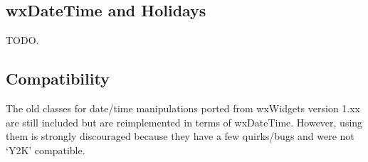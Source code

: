 \subsection{wxDateTime and Holidays}\label{tdateholidays}

TODO.

\subsection{Compatibility}\label{tdatecompatibility}

The old classes for date/time manipulations ported from wxWidgets version 1.xx
are still included but are reimplemented in terms of wxDateTime. However, using
them is strongly discouraged because they have a few quirks/bugs and were not
`Y2K' compatible.

